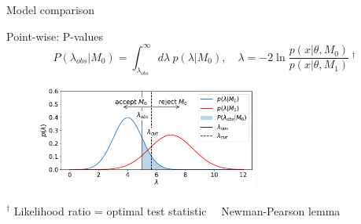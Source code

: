 \documentclass[
aspectratio=169,
14pt,
professionalfonts
]{beamer}
\newcommand{\arrow}{~\ding{220}~}
\begin{document}
\begin{frame}
    \center
    \Large
    Model comparison
\end{frame}

\begin{frame}{Point-wise: P-values}
    \vspace{-1cm}
    $$
    P(\lambda_{obs}|M_0) = \int_{\lambda_{obs}}^\infty d\lambda ~ p(\lambda|M_0), \quad  \lambda = -2 \ln \frac{p(x|\theta, M_0)}{p(x|\theta, M_1)} ~^\dagger
    $$
    \begin{figure}
        \centering
        \includegraphics[width=0.65\textwidth]{../plots/hypo.pdf}
    \end{figure}
    \small
    $^\dagger$ Likelihood ratio = optimal test statistic \arrow Newman-Pearson lemma
\end{frame}
\end{document}
